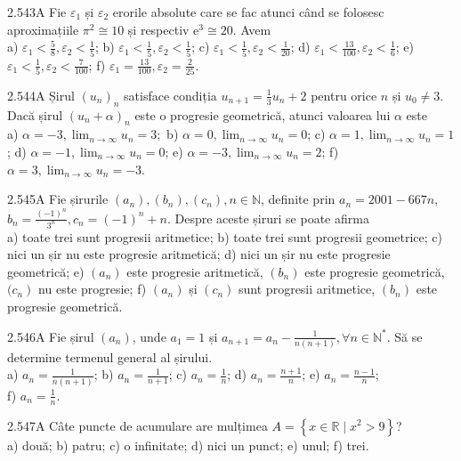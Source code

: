 \documentclass[11pt]{article}
\begin{document}
2.543A Fie $\varepsilon_{1}$ și $\varepsilon_{2}$ erorile absolute care se fac atunci când se folosesc aproximațiile $\pi^{2} \cong 10$ și respectiv $\mathrm{e}^{3} \cong 20$. Avem\\ a) $\varepsilon_{1}<\frac{5}{8}, \varepsilon_{2}<\frac{1}{5}$; b) $\varepsilon_{1}<\frac{1}{5}, \varepsilon_{2}<\frac{1}{5}$; c) $\varepsilon_{1}<\frac{1}{5}, \varepsilon_{2}<\frac{1}{20}$; d) $\varepsilon_{1}<\frac{13}{100}, \varepsilon_{2}<\frac{1}{6}$; e) $\varepsilon_{1}<\frac{1}{5}, \varepsilon_{2}<\frac{7}{100}$; f) $\varepsilon_{1}=\frac{13}{100}, \varepsilon_{2}=\frac{2}{25}$.

2.544A Șirul $\left(u_{n}\right)_{n}$ satisface condiția $u_{n+1}=\frac{1}{3} u_{n}+2$ pentru orice $n$ și $u_{0} \neq 3$. Dacă șirul $\left(u_{n}+\alpha\right)_{n}$ este o progresie geometrică, atunci valoarea lui $\alpha$ este\\ a) $\alpha=-3, \lim _{n \rightarrow \infty} u_{n}=3 ;$ b) $\alpha=0, \lim _{n \rightarrow \infty} u_{n}=0$; c) $\alpha=1, \lim _{n \rightarrow \infty} u_{n}=1$; d) $\alpha=-1, \lim _{n \rightarrow \infty} u_{n}=0$; e) $\alpha=-3, \lim _{n \rightarrow \infty} u_{n}=2$; f) $\alpha=3, \lim _{n \rightarrow \infty} u_{n}=-3$.

2.545A Fie șirurile $\left(a_{n}\right),\left(b_{n}\right),\left(c_{n}\right), n \in \mathbb{N}$, definite prin $a_{n}=2001-667 n$, $b_{n}=\frac{(-1)^{n}}{3^{n}}, c_{n}=(-1)^{n}+n$. Despre aceste șiruri se poate afirma\\ a) toate trei sunt progresii aritmetice; b) toate trei sunt progresii geometrice; c) nici un șir nu este progresie aritmetică; d) nici un șir nu este progresie geometrică; e) $\left(a_{n}\right)$ este progresie aritmetică, $\left(b_{n}\right)$ este progresie geometrică, $(\left.c_{n}\right)$ nu este progresie; f) $\left(a_{n}\right)$ și $\left(c_{n}\right)$ sunt progresii aritmetice, $\left(b_{n}\right)$ este progresie geometrică.

2.546A Fie șirul $\left(a_{n}\right)$, unde $a_{1}=1$ și $a_{n+1}=a_{n}-\frac{1}{n(n+1)}, \forall n \in \mathbb{N}^{*}$. Să se determine termenul general al șirului.\\ a) $a_{n}=\frac{1}{n(n+1)}$; b) $a_{n}=\frac{1}{n+1}$; c) $a_{n}=\frac{1}{n}$; d) $a_{n}=\frac{n+1}{n}$; e) $a_{n}=\frac{n-1}{n}$;\\ f) $a_{n}=\frac{1}{n}$.

2.547A Câte puncte de acumulare are mulțimea $A=\left\{x \in \mathbb{R} \mid x^{2}>9\right\}$?\\ a) două; b) patru; c) o infinitate; d) nici un punct; e) unul; f) trei.
\end{document}
